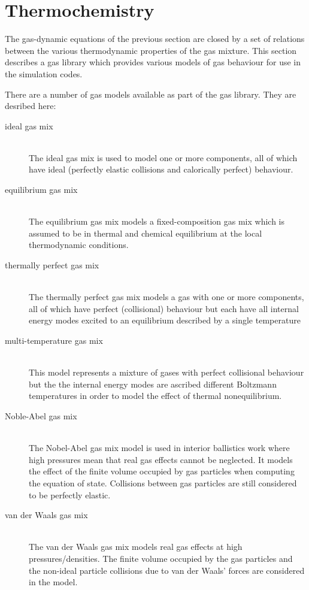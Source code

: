 
\section{Thermochemistry}
\label{thermochem-sec}
The gas-dynamic equations of the previous section are closed by a set of relations
between the various thermodynamic properties of the gas mixture.
This section describes a gas library which provides various models of gas behaviour for use
in the simulation codes.

There are a number of gas models available as part of the gas library. They are desribed here:
\begin{description}
 \item[ideal gas mix] \hspace{1cm} \\
     The ideal gas mix is used to model one or more components, all of which
     have ideal (perfectly elastic collisions and calorically perfect) behaviour.
 \item[equilibrium gas mix] \hspace{1cm} \\
     The equilibrium gas mix models a fixed-composition gas mix which is assumed to be in thermal and
     chemical equilibrium at the local thermodynamic conditions.
 \item[thermally perfect gas mix] \hspace{1cm} \\
     The thermally perfect gas mix models a gas with one or more components, all of which
     have perfect (collisional) behaviour but each have all internal energy modes excited to
     an equilibrium described by a single temperature
 \item[multi-temperature gas mix] \hspace{1cm} \\
     This model represents a mixture of gases with perfect collisional behaviour but the
     the internal energy modes are ascribed different Boltzmann temperatures in order
     to model the effect of thermal nonequilibrium.
 \item[Noble-Abel gas mix] \hspace{1cm} \\
     The Nobel-Abel gas mix model is used in interior ballistics work where high pressures mean
     that real gas effects cannot be neglected.  It models the effect
     of the finite volume occupied by gas particles when computing the equation of state.
     Collisions between gas particles are still considered to be perfectly elastic.
 \item[van der Waals gas mix] \hspace{1cm} \\
     The van der Waals gas mix models real gas effects at high pressures/densities.  The finite volume
     occupied by the gas particles and the non-ideal particle collisions due to van der Waals' forces
     are considered in the model.
\end{description}

